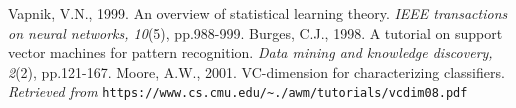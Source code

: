 \documentclass[11pt]{article}
\begin{document}
	
	\begin{thebibliography}{10}
        Vapnik, V.N., 1999. An overview of statistical learning theory. \emph{IEEE transactions on neural networks, 10}(5), pp.988-999.
        Burges, C.J., 1998. A tutorial on support vector machines for pattern recognition. \emph{Data mining and knowledge discovery, 2}(2), pp.121-167.
        Moore, A.W., 2001. VC-dimension for characterizing classifiers. \emph{Retrieved from} \texttt{https://www.cs.cmu.edu/\textasciitilde./awm/tutorials/vcdim08.pdf} %
	\end{thebibliography}
\end{document}
